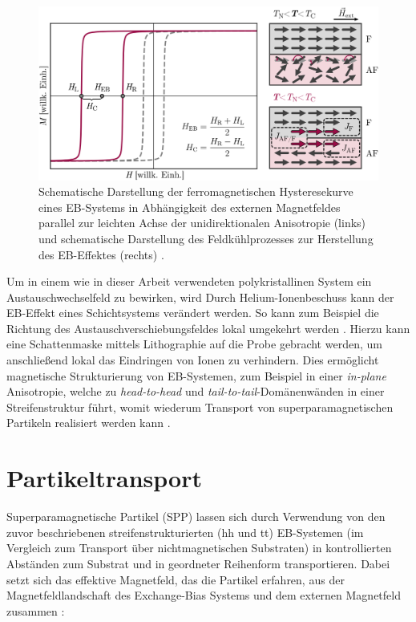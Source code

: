 \documentclass[page,pdftex,12pt,a4paper,twoside,openright]{scrbook}
\begin{document}
\begin{figure}[!h]
\centering
\includegraphics[width=\textwidth]{img/eb.png}
\caption{\label{fig-eb}
Schematische Darstellung der ferromagnetischen Hysteresekurve eines EB-Systems in Abhängigkeit des externen Magnetfeldes parallel zur leichten Achse der unidirektionalen Anisotropie (links) und schematische Darstellung des Feldkühlprozesses zur Herstellung des EB-Effektes (rechts) \cite{merkel_einfluss_2018}.}
\end{figure}

Um in einem wie in dieser Arbeit verwendeten polykristallinen System ein Austauschwechselfeld zu bewirken, wird 
Durch Helium-Ionenbeschuss kann der EB-Effekt eines Schichtsystems verändert werden. So kann zum Beispiel die Richtung des Austauschverschiebungsfeldes lokal umgekehrt werden \cite{mougin_local_2001}. Hierzu kann eine Schattenmaske mittels Lithographie auf die Probe gebracht werden, um anschließend lokal das Eindringen von Ionen zu verhindern. Dies ermöglicht magnetische Strukturierung von EB-Systemen, zum Beispiel in einer \emph{in-plane} Anisotropie, welche zu \emph{head-to-head} und \emph{tail-to-tail}-Domänenwänden in einer Streifenstruktur führt, womit wiederum Transport von superparamagnetischen Partikeln realisiert werden kann \cite{holzinger_directed_2015}.

\section{Partikeltransport \label{sec-partikeltransport}}
\label{sec:org39f9a77}
Superparamagnetische Partikel (SPP) lassen sich durch Verwendung von den zuvor beschriebenen streifenstrukturierten (hh und tt) EB-Systemen (im Vergleich zum Transport über nichtmagnetischen Substraten) in kontrollierten Abständen zum Substrat und in geordneter Reihenform transportieren. Dabei setzt sich das effektive Magnetfeld, das die Partikel erfahren, aus der Magnetfeldlandschaft des Exchange-Bias Systems und dem externen Magnetfeld zusammen \cite{holzinger_directed_2015}:
\end{document}

